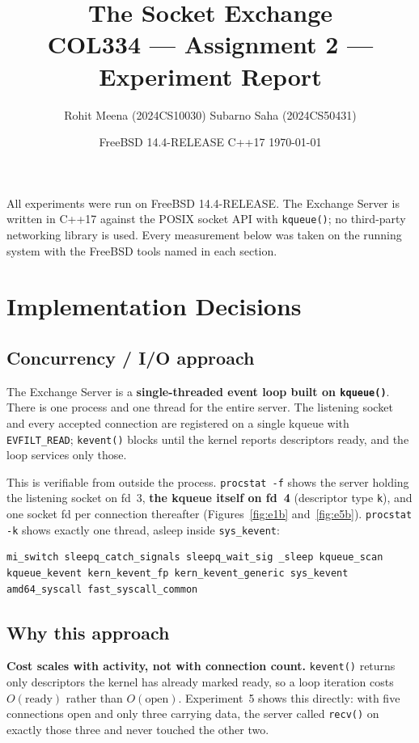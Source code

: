 \documentclass[11pt,a4paper]{article}
\title{\textbf{The Socket Exchange}\\[0.3em]
       \large COL334 --- Assignment 2 --- Experiment Report}
\author{Rohit Meena (2024CS10030) \quad\textbullet\quad Subarno Saha (2024CS50431)}
\date{FreeBSD 14.4-RELEASE \quad\textbullet\quad C++17 \quad\textbullet\quad \today}
\newcommand{\cmd}[1]{\texttt{\small #1}}
\begin{document}
\maketitle

All experiments were run on FreeBSD 14.4-RELEASE. The Exchange Server is written
in C++17 against the POSIX socket API with \cmd{kqueue()}; no third-party
networking library is used. Every measurement below was taken on the running
system with the FreeBSD tools named in each section.

\tableofcontents
\newpage

\section{Implementation Decisions}

\subsection{Concurrency / I/O approach}

The Exchange Server is a \textbf{single-threaded event loop built on
\cmd{kqueue()}}. There is one process and one thread for the entire server. The
listening socket and every accepted connection are registered on a single kqueue
with \cmd{EVFILT\_READ}; \cmd{kevent()} blocks until the kernel reports
descriptors ready, and the loop services only those.

This is verifiable from outside the process. \cmd{procstat -f} shows the server
holding the listening socket on fd~3, \textbf{the kqueue itself on fd~4}
(descriptor type \cmd{k}), and one socket fd per connection thereafter
(Figures~\ref{fig:e1b} and~\ref{fig:e5b}). \cmd{procstat -k} shows exactly one
thread, asleep inside \cmd{sys\_kevent}:

\begin{Verbatim}[fontsize=\small,frame=single]
mi_switch sleepq_catch_signals sleepq_wait_sig _sleep kqueue_scan
kqueue_kevent kern_kevent_fp kern_kevent_generic sys_kevent
amd64_syscall fast_syscall_common
\end{Verbatim}

\subsection{Why this approach}

\textbf{Cost scales with activity, not with connection count.} \cmd{kevent()}
returns only descriptors the kernel has already marked ready, so a loop
iteration costs $O(\mathrm{ready})$ rather than $O(\mathrm{open})$. Experiment~5
shows this directly: with five connections open and only three carrying data,
the server called \cmd{recv()} on exactly those three and never touched the
other two.
\end{document}
